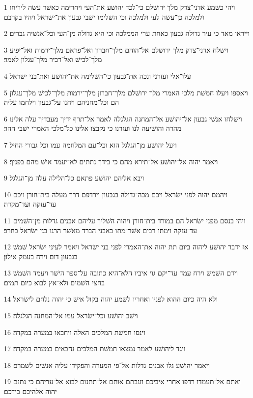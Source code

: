 \par 1 ויהי כשׁמע אדני־צדק מלך ירושׁלם כי־לכד יהושׁע את־העי ויחרימה כאשׁר עשׂה ליריחו ולמלכה כן־עשׂה לעי ולמלכה וכי השׁלימו ישׁבי גבעון את־ישׂראל ויהיו בקרבם׃
\par 2 וייראו מאד כי עיר גדולה גבעון כאחת ערי הממלכה וכי היא גדולה מן־העי וכל־אנשׁיה גברים׃
\par 3 וישׁלח אדני־צדק מלך ירושׁלם אל־הוהם מלך־חברון ואל־פראם מלך־ירמות ואל־יפיע מלך־לכישׁ ואל־דביר מלך־עגלון לאמר׃
\par 4 עלו־אלי ועזרני ונכה את־גבעון כי־השׁלימה את־יהושׁע ואת־בני ישׂראל׃
\par 5 ויאספו ויעלו חמשׁת מלכי האמרי מלך ירושׁלם מלך־חברון מלך־ירמות מלך־לכישׁ מלך־עגלון הם וכל־מחניהם ויחנו על־גבעון וילחמו עליה׃
\par 6 וישׁלחו אנשׁי גבעון אל־יהושׁע אל־המחנה הגלגלה לאמר אל־תרף ידיך מעבדיך עלה אלינו מהרה והושׁיעה לנו ועזרנו כי נקבצו אלינו כל־מלכי האמרי ישׁבי ההר׃
\par 7 ויעל יהושׁע מן־הגלגל הוא וכל־עם המלחמה עמו וכל גבורי החיל׃
\par 8 ויאמר יהוה אל־יהושׁע אל־תירא מהם כי בידך נתתים לא־יעמד אישׁ מהם בפניך׃
\par 9 ויבא אליהם יהושׁע פתאם כל־הלילה עלה מן־הגלגל׃
\par 10 ויהמם יהוה לפני ישׂראל ויכם מכה־גדולה בגבעון וירדפם דרך מעלה בית־חורן ויכם עד־עזקה ועד־מקדה׃
\par 11 ויהי בנסם מפני ישׂראל הם במורד בית־חורן ויהוה השׁליך עליהם אבנים גדלות מן־השׁמים עד־עזקה וימתו רבים אשׁר־מתו באבני הברד מאשׁר הרגו בני ישׂראל בחרב׃
\par 12 אז ידבר יהושׁע ליהוה ביום תת יהוה את־האמרי לפני בני ישׂראל ויאמר לעיני ישׂראל שׁמשׁ בגבעון דום וירח בעמק אילון׃
\par 13 וידם השׁמשׁ וירח עמד עד־יקם גוי איביו הלא־היא כתובה על־ספר הישׁר ויעמד השׁמשׁ בחצי השׁמים ולא־אץ לבוא כיום תמים׃
\par 14 ולא היה כיום ההוא לפניו ואחריו לשׁמע יהוה בקול אישׁ כי יהוה נלחם לישׂראל׃
\par 15 וישׁב יהושׁע וכל־ישׂראל עמו אל־המחנה הגלגלה׃
\par 16 וינסו חמשׁת המלכים האלה ויחבאו במערה במקדה׃
\par 17 ויגד ליהושׁע לאמר נמצאו חמשׁת המלכים נחבאים במערה במקדה׃
\par 18 ויאמר יהושׁע גלו אבנים גדלות אל־פי המערה והפקידו עליה אנשׁים לשׁמרם׃
\par 19 ואתם אל־תעמדו רדפו אחרי איביכם וזנבתם אותם אל־תתנום לבוא אל־עריהם כי נתנם יהוה אלהיכם בידכם׃
